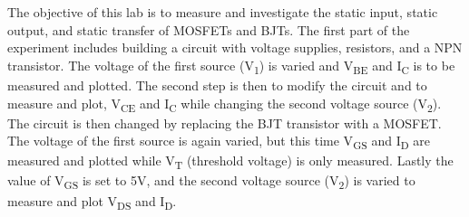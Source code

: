 The objective of this lab is to measure and investigate the static input, static output, and static transfer of MOSFETs and BJTs. The first part of the experiment includes building a circuit with voltage supplies, resistors, and a NPN transistor. The voltage of the first source (V\textsubscript{1}) is varied and V\textsubscript{BE} and I\textsubscript{C} is to be measured and plotted. The second step is then to modify the circuit and to measure and plot, V\textsubscript{CE} and I\textsubscript{C} while changing the second voltage source (V\textsubscript{2}). The circuit is then changed by replacing the BJT transistor with a MOSFET. The voltage of the first source is again varied, but this time V\textsubscript{GS} and I\textsubscript{D} are measured and plotted while V\textsubscript{T} (threshold voltage) is only measured. Lastly the value of V\textsubscript{GS} is set to 5V, and the second voltage source (V\textsubscript{2}) is varied to measure and plot V\textsubscript{DS} and I\textsubscript{D}. \\
